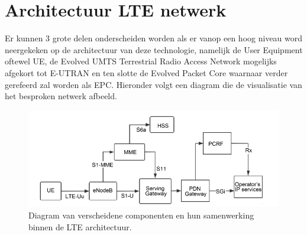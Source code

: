 \section{Architectuur LTE netwerk}
Er kunnen 3 grote delen onderscheiden worden als er vanop een hoog niveau word neergekeken op de architectuur van deze technologie, namelijk de User Equipment oftewel UE, de Evolved UMTS Terrestrial Radio Access Network mogelijks afgekort tot E-UTRAN en ten slotte de Evolved Packet Core waarnaar verder gerefeerd zal worden als EPC. \autocite{Richard2021} Hieronder volgt een diagram die de visualisatie van het besproken netwerk afbeeld. 
\begin{figure}[!htb]
    \includegraphics[width=1\linewidth]{graphics/LTE_architecture}
    \caption[Overzicht van de verscheidene componenten van de LTE architectuur.]{Diagram van verscheidene componenten en hun samenwerking binnen de LTE architectuur. \autocite{Yunman2021}}
    \label{fig:ltearchitecture}
\end{figure}

